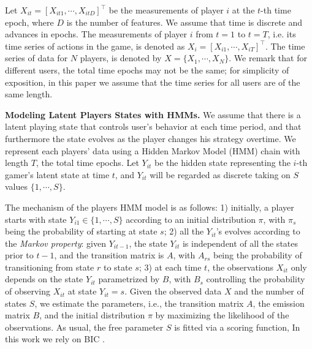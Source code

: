 Let $X_{it} = [X_{it1}, \cdots, X_{itD}]^\top$ be the measurements of player $i$ at the $t$-th time epoch, 
where $D$ is the number of features.  We assume that time is discrete and advances in epochs. 
The measurements of player $i$ from $t = 1$ to  $t = T$, i.e. its time series of actions in the game,  is denoted as $X_{i} = [X_{i1}, \cdots, X_{iT}]^\top$. The time series of data for   $N$ players, is denoted by $X = \{ X_1, \cdots, X_N \}$.  We remark that for different users, the total time epochs may not be the same; for simplicity of exposition, in this paper we assume  
that the time series for all users are of the same length.

{\bf Modeling Latent Players States with HMMs.}
We assume that there is a latent playing state that controls user's behavior at each time period, and that furthermore the state evolves  as the player changes his strategy overtime.  We represent each players' data using a Hidden Markov Model (HMM) \cite{hmm} chain with length $T$, the total time epochs.  Let $Y_{it}$ be the hidden state representing 
the $i$-th gamer's  latent state at time $t$, and $Y_{it}$ will be regarded as discrete taking on $S$ values $\{1, \cdots, S\}$. 


The mechanism of the players HMM model is as follows: 1) initially, a player starts with state 
$Y_{i1} \in \{1, \cdots, S\}$ according to an initial distribution $\pi$,  with $\pi_s$ being 
the probability of starting at state $s$; 2) all the $Y_{it}$'s  evolves according to the 
{\it Markov property}: given $Y_{i{t-1}}$, the state $Y_{it}$ is independent of all the 
states prior to $t-1$, and the transition matrix is $A$, with $A_{rs}$ being the probability of 
transitioning from state $r$ to state $s$; 3) at each time $t$, the observations $X_{it}$ only 
depends on the state $Y_{it}$ parametrized by $B$, with $B_s$ controlling the probability 
of observing $X_{it}$ at state $Y_{it} = s$. 
Given the observed data $X$ and the number of states $S$, we  estimate the parameters, i.e., the transition matrix $A$, the emission matrix $B$, and the initial distribution $\pi$ by maximizing the 
likelihood of the observations. As usual, the free parameter $S$ is fitted via a scoring function,  In this work we rely on  BIC \cite{bic}.

